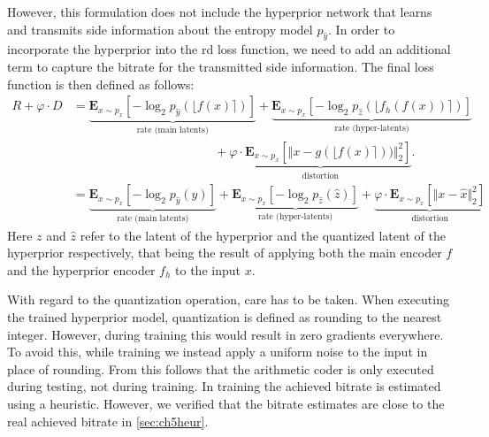However, this formulation does not include the hyperprior network that learns and transmits side information about the entropy model $p_{\hat{y}}$. In order to incorporate the hyperprior into the \ac{rd} loss function, we need to add an additional term to capture the bitrate for the transmitted side information. The final loss function is then defined as follows:
\begin{align}
R + \varphi \cdot D &= \underbrace{\mathbf{E}_{x\sim p_x} [ -\log_2 p_{\hat{y}}(\lfloor f(x)\rceil)]}_\text{rate (main latents)} + 
\underbrace{\mathbf{E}_{x\sim p_x} [ -\log_2 p_{\hat{z}}(\lfloor f_h(f(x))\rceil)]}_\text{rate (hyper-latents)}\\ 
&\qquad\qquad\qquad\qquad\qquad\quad\:\: + \underbrace{\varphi \cdot\mathbf{E}_{x\sim p_x} [\Vert x - g(\lfloor f(x)\rceil))\Vert^2_2]}_\text{distortion}.\\
&=\underbrace{\mathbf{E}_{x\sim p_x} [ -\log_2 p_{\hat{y}}(\hat{y})]}_\text{rate (main latents)} + 
\underbrace{\mathbf{E}_{x\sim p_x} [ -\log_2 p_{\hat{z}}(\hat{z})]}_\text{rate (hyper-latents)} + \underbrace{\varphi \cdot\mathbf{E}_{x\sim p_x} [\Vert x - \hat{x}\Vert^2_2]}_\text{distortion}
\end{align}
Here $z$ and $\hat{z}$ refer to the latent of the hyperprior and the quantized latent of the hyperprior respectively, that being the result of applying both the main encoder $f$ and the hyperprior encoder $f_h$ to the input $x$.

With regard to the quantization operation, care has to be taken. When executing the trained hyperprior model, quantization is defined as rounding to the nearest integer. However, during training this would result in zero gradients everywhere. To avoid this, while training we instead apply a uniform noise to the input in place of rounding. From this follows that the arithmetic coder is only executed during testing, not during training. In training the achieved bitrate is estimated using a heuristic. However, we verified that the bitrate estimates are close to the real achieved bitrate in \autoref{sec:ch5heur}.
